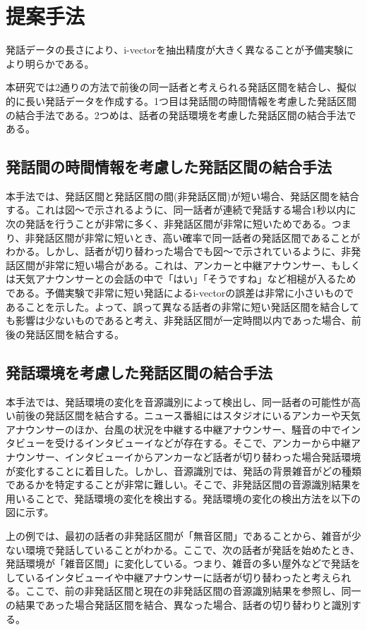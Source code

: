 \chapter{提案手法}
発話データの長さにより、i-vectorを抽出精度が大きく異なることが予備実験により明らかである。\par
本研究では2通りの方法で前後の同一話者と考えられる発話区間を結合し、擬似的に長い発話データを作成する。1つ目は発話間の時間情報を考慮した発話区間の結合手法である。2つめは、話者の発話環境を考慮した発話区間の結合手法である。

\section{発話間の時間情報を考慮した発話区間の結合手法}
本手法では、発話区間と発話区間の間(非発話区間)が短い場合、発話区間を結合する。これは図〜で示されるように、同一話者が連続で発話する場合1秒以内に次の発話を行うことが非常に多く、非発話区間が非常に短いためである。つまり、非発話区間が非常に短いとき、高い確率で同一話者の発話区間であることがわかる。しかし、話者が切り替わった場合でも図〜で示されているように、非発話区間が非常に短い場合がある。これは、アンカーと中継アナウンサー、もしくは天気アナウンサーとの会話の中で「はい」「そうですね」など相槌が入るためである。予備実験で非常に短い発話によるi-vectorの誤差は非常に小さいものであることを示した。よって、誤って異なる話者の非常に短い発話区間を結合しても影響は少ないものであると考え、非発話区間が一定時間以内であった場合、前後の発話区間を結合する。

\section{発話環境を考慮した発話区間の結合手法}
本手法では、発話環境の変化を音源識別によって検出し、同一話者の可能性が高い前後の発話区間を結合する。ニュース番組にはスタジオにいるアンカーや天気アナウンサーのほか、台風の状況を中継する中継アナウンサー、騒音の中でインタビューを受けるインタビューイなどが存在する。そこで、アンカーから中継アナウンサー、インタビューイからアンカーなど話者が切り替わった場合発話環境が変化することに着目した。しかし、音源識別では、発話の背景雑音がどの種類であるかを特定することが非常に難しい。そこで、非発話区間の音源識別結果を用いることで、発話環境の変化を検出する。発話環境の変化の検出方法を以下の図に示す。\par



上の例では、最初の話者の非発話区間が「無音区間」であることから、雑音が少ない環境で発話していることがわかる。ここで、次の話者が発話を始めたとき、発話環境が「雑音区間」に変化している。つまり、雑音の多い屋外などで発話をしているインタビューイや中継アナウンサーに話者が切り替わったと考えられる。ここで、前の非発話区間と現在の非発話区間の音源識別結果を参照し、同一の結果であった場合発話区間を結合、異なった場合、話者の切り替わりと識別する。
